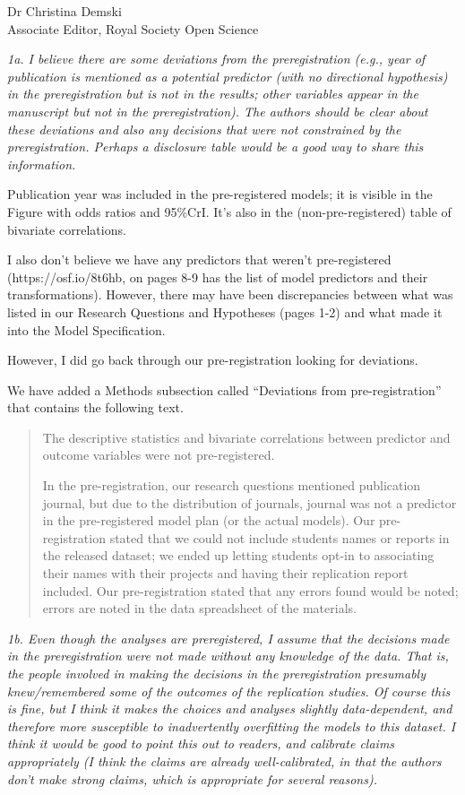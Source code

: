 \documentclass{stanfordletter}
\newcommand{\theysaid}[1]{\begin{leftbar} \noindent 
		\textsl{ #1}\end{leftbar}}
\newcommand{\revised}[1]{\begin{quote}	#1 \end{quote}}
\begin{document}
\begin{letter}{Dr Christina Demski \\ Associate Editor, Royal Society Open Science}
          \theysaid{	1a. I believe there are some deviations from the preregistration (e.g., year of publication is mentioned as a potential predictor (with no directional hypothesis) in the preregistration but is not in the results; other variables appear in the manuscript but not in the preregistration). The authors should be clear about these deviations and also any decisions that were not constrained by the preregistration. Perhaps a disclosure table would be a good way to share this information.}
          
          Publication year was included in the pre-registered models; it is visible in the Figure with odds ratios and 95\%CrI. It's also in the (non-pre-registered) table of bivariate correlations. 
          
          I also don't believe we have any predictors that weren't pre-registered (https://osf.io/8t6hb, on pages 8-9 has the list of model predictors and their transformations). However, there may have been discrepancies between what was listed in our Research Questions and Hypotheses (pages 1-2) and what made it into the Model Specification. 
 
 
         However, I did go back through our pre-registration looking for deviations. 
         
         We have added a Methods subsection called ``Deviations from pre-registration'' that contains the following text. 
         
         \revised{
         The descriptive statistics and bivariate correlations between predictor and outcome variables were not pre-registered.
         
         
         In the pre-registration, our research questions mentioned publication journal, but due to the distribution of journals, journal was not a predictor in the pre-registered model plan (or the actual models). Our pre-registration stated that we could not include students names or reports in the released dataset; we ended up letting students opt-in to associating their names with their projects and having their replication report included. Our pre-registration stated that any errors found would be noted; errors are noted in the data spreadsheet of the materials.}
         
          \theysaid{
          	1b. Even though the analyses are preregistered, I assume that the decisions made in the preregistration were not made without any knowledge of the data.  That is, the people involved in making the decisions in the preregistration presumably knew/remembered some of the outcomes of the replication studies.  Of course this is fine, but I think it makes the choices and analyses slightly data-dependent, and therefore more susceptible to inadvertently overfitting the models to this dataset. I think it would be good to point this out to readers, and calibrate claims appropriately (I think the claims are already well-calibrated, in that the authors don't make strong claims, which is appropriate for several reasons).
          }
          

\end{letter}
\end{document}
